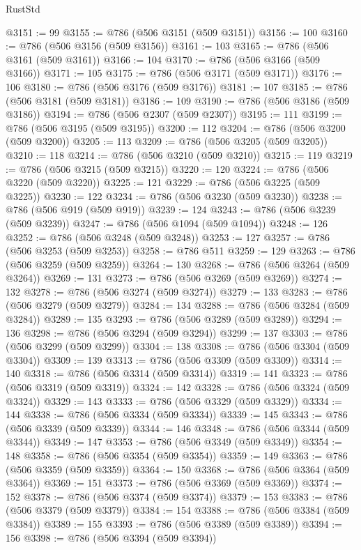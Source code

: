 \begin{lexlean}{RustStd}
\begin{coremodule}
@3151 := 99
@3155 := @786 (@506 @3151 (@509 @3151))
@3156 := 100
@3160 := @786 (@506 @3156 (@509 @3156))
@3161 := 103
@3165 := @786 (@506 @3161 (@509 @3161))
@3166 := 104
@3170 := @786 (@506 @3166 (@509 @3166))
@3171 := 105
@3175 := @786 (@506 @3171 (@509 @3171))
@3176 := 106
@3180 := @786 (@506 @3176 (@509 @3176))
@3181 := 107
@3185 := @786 (@506 @3181 (@509 @3181))
@3186 := 109
@3190 := @786 (@506 @3186 (@509 @3186))
@3194 := @786 (@506 @2307 (@509 @2307))
@3195 := 111
@3199 := @786 (@506 @3195 (@509 @3195))
@3200 := 112
@3204 := @786 (@506 @3200 (@509 @3200))
@3205 := 113
@3209 := @786 (@506 @3205 (@509 @3205))
@3210 := 118
@3214 := @786 (@506 @3210 (@509 @3210))
@3215 := 119
@3219 := @786 (@506 @3215 (@509 @3215))
@3220 := 120
@3224 := @786 (@506 @3220 (@509 @3220))
@3225 := 121
@3229 := @786 (@506 @3225 (@509 @3225))
@3230 := 122
@3234 := @786 (@506 @3230 (@509 @3230))
@3238 := @786 (@506 @919 (@509 @919))
@3239 := 124
@3243 := @786 (@506 @3239 (@509 @3239))
@3247 := @786 (@506 @1094 (@509 @1094))
@3248 := 126
@3252 := @786 (@506 @3248 (@509 @3248))
@3253 := 127
@3257 := @786 (@506 @3253 (@509 @3253))
@3258 := @786 @511
@3259 := 129
@3263 := @786 (@506 @3259 (@509 @3259))
@3264 := 130
@3268 := @786 (@506 @3264 (@509 @3264))
@3269 := 131
@3273 := @786 (@506 @3269 (@509 @3269))
@3274 := 132
@3278 := @786 (@506 @3274 (@509 @3274))
@3279 := 133
@3283 := @786 (@506 @3279 (@509 @3279))
@3284 := 134
@3288 := @786 (@506 @3284 (@509 @3284))
@3289 := 135
@3293 := @786 (@506 @3289 (@509 @3289))
@3294 := 136
@3298 := @786 (@506 @3294 (@509 @3294))
@3299 := 137
@3303 := @786 (@506 @3299 (@509 @3299))
@3304 := 138
@3308 := @786 (@506 @3304 (@509 @3304))
@3309 := 139
@3313 := @786 (@506 @3309 (@509 @3309))
@3314 := 140
@3318 := @786 (@506 @3314 (@509 @3314))
@3319 := 141
@3323 := @786 (@506 @3319 (@509 @3319))
@3324 := 142
@3328 := @786 (@506 @3324 (@509 @3324))
@3329 := 143
@3333 := @786 (@506 @3329 (@509 @3329))
@3334 := 144
@3338 := @786 (@506 @3334 (@509 @3334))
@3339 := 145
@3343 := @786 (@506 @3339 (@509 @3339))
@3344 := 146
@3348 := @786 (@506 @3344 (@509 @3344))
@3349 := 147
@3353 := @786 (@506 @3349 (@509 @3349))
@3354 := 148
@3358 := @786 (@506 @3354 (@509 @3354))
@3359 := 149
@3363 := @786 (@506 @3359 (@509 @3359))
@3364 := 150
@3368 := @786 (@506 @3364 (@509 @3364))
@3369 := 151
@3373 := @786 (@506 @3369 (@509 @3369))
@3374 := 152
@3378 := @786 (@506 @3374 (@509 @3374))
@3379 := 153
@3383 := @786 (@506 @3379 (@509 @3379))
@3384 := 154
@3388 := @786 (@506 @3384 (@509 @3384))
@3389 := 155
@3393 := @786 (@506 @3389 (@509 @3389))
@3394 := 156
@3398 := @786 (@506 @3394 (@509 @3394))

\end{coremodule}
\end{lexlean}
